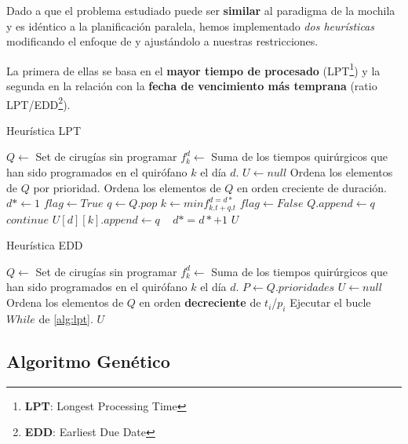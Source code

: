 Dado a que el problema estudiado puede ser \textbf{similar} al paradigma de la mochila y es idéntico a la planificación paralela, hemos implementado \textit{dos heurísticas} modificando el enfoque de \cite{Lin2020AScheduling} y ajustándolo a nuestras restricciones.

La primera de ellas se basa en el \textbf{mayor tiempo de procesado} (LPT\footnote{\textbf{LPT}: Longest Processing Time}) y la segunda en la relación con la \textbf{fecha de vencimiento más temprana} (ratio LPT/EDD\footnote{\textbf{EDD}: Earliest Due Date}).

\begin{algorithm}
\caption{Heurística LPT}\label{alg:lpt}
\begin{algorithmic}
\State $Q \gets $ Set de cirugías sin programar
\State $f_{k}^{d} \gets $ Suma de los tiempos quirúrgicos que han sido programados en el quirófano $k$ el día $d$.
\State $U \gets null$ 
 \State Ordena los elementos de $Q$ por prioridad.
 \State Ordena los elementos de $Q$ en orden creciente de duración.
\State $d* \gets 1$
\State $flag \gets True$
        \State $q \gets Q.pop$
        \State $k \gets min f_{k.t+q.t}^{d=d*}$
       \State $flag \gets False$
        \EndIf
        \State $Q.append \gets q$
        \State $continue$
        \EndIf
        \State $U[d][k].append \gets q$
        \
        \EndWhile
        \State $d* = d* + 1$
\EndWhile
\State \Return $U$
\end{algorithmic}
\end{algorithm}

\begin{algorithm}
\caption{Heurística EDD}\label{alg:lpt/edd}
\begin{algorithmic}
\State $Q \gets $ Set de cirugías sin programar
\State $f_{k}^{d} \gets $ Suma de los tiempos quirúrgicos que han sido programados en el quirófano $k$ el día $d$.
\State $P \gets Q.prioridades$
\State $U \gets null$ 
 \State Ordena los elementos de $Q$ en orden \textbf{decreciente} de $t_{i}$/$p_{i}$
\State Ejecutar el bucle $While$ de \ref{alg:lpt}.
\State \Return $U$
\end{algorithmic}
\end{algorithm}


\subsection{Algoritmo Genético}

